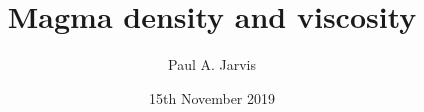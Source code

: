 \documentclass{beamer}
\title[Modeling volcanic processes]{Magma density and viscosity} %
\author[Paul Jarvis]{Paul A. Jarvis} %
\institute[UNIGE] %
{
\textit{paul.jarvis@unige.ch} %
}
\date{15th November 2019} %
\begin{document}
\begin{frame}
\titlepage %
\end{frame}





\end{document}
